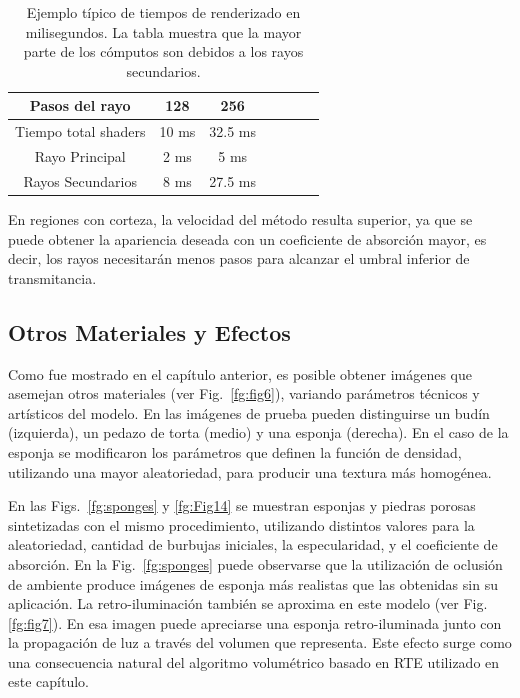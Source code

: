 \begin{table}[htb]
\centering
\begin{tabular}{|c|c|c|c|c|c|c|}
\hline
 Pasos del rayo         & 128 &  256 \\
\hline
\hline
 Tiempo total shaders   & 10 ms &  32.5 ms \\
\hline
 Rayo Principal         & 2 ms  & 5 ms  \\
\hline
 Rayos Secundarios      &  8 ms & 27.5 ms  \\
\hline
\end{tabular}
\caption[Tiempos de renderizado en milisegundos]{Ejemplo típico de tiempos de renderizado en milisegundos. La tabla muestra que la mayor parte de los cómputos son debidos a los rayos secundarios.}
\label{tab:rayossecundarios}
\end{table}


En regiones con corteza, la velocidad del método resulta superior, ya que se puede obtener la apariencia deseada con un coeficiente de absorción mayor, es decir, los rayos necesitarán menos pasos para alcanzar el umbral inferior de transmitancia.

\subsection{Otros Materiales y Efectos}
Como fue mostrado en el capítulo anterior, es posible obtener imágenes que asemejan otros materiales (ver Fig.~\ref{fg:fig6}), variando parámetros técnicos y artísticos del modelo.
En las imágenes de prueba pueden distinguirse un budín (izquierda), un pedazo de torta (medio) y una esponja (derecha).
En el caso de la esponja se modificaron los parámetros que definen la función de densidad, utilizando una mayor aleatoriedad, para producir una textura más homogénea.

En las Figs.~\ref{fg:sponges} y \ref{fg:Fig14} se muestran esponjas y piedras porosas sintetizadas con el mismo procedimiento, utilizando distintos valores para la aleatoriedad, cantidad de burbujas iniciales, la especularidad, y el coeficiente de absorción.
En la Fig.~\ref{fg:sponges} puede observarse que la utilización de oclusión de ambiente produce imágenes de esponja más realistas que las obtenidas sin su aplicación.
La retro-iluminación también se aproxima en este modelo (ver Fig. \ref{fg:fig7}).
En esa imagen puede apreciarse una esponja retro-iluminada junto con la propagación de luz a través del volumen que representa.
Este efecto surge como una consecuencia natural del algoritmo volumétrico basado en RTE utilizado en este capítulo.

